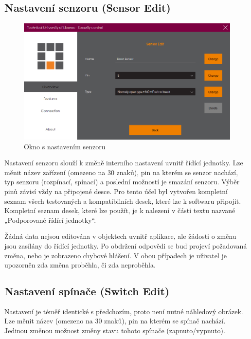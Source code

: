 \documentclass[FM,DP]{tulthesis}  %
\begin{document}
\subsection{Nastavení senzoru (Sensor Edit)}

\begin{figure}[H]
\begin{center}
\includegraphics[width=\textwidth]{images/settings.png}
\caption{Okno s nastavením senzoru}
\label{image}
\end{center}
\end{figure}

Nastavení senzoru slouží k změně interního nastavení uvnitř řídící jednotky. Lze měnit název zařízení (omezeno na 30 znaků), pin na kterém se senzor nachází, typ senzoru (rozpínací, spínací) a poslední možností je smazání senzoru. Výběr pinů závisí vždy na připojené desce. Pro tento účel byl vytvořen kompletní seznam všech testovaných a kompatibilních desek, které lze k softwaru připojit. Kompletní seznam desek, které lze použít, je k nalezení v části textu nazvané „Podporované řídící jednotky“. 

Žádná data nejsou editována v objektech uvnitř aplikace, ale žádosti o změnu jsou zasílány do řídící jednotky. Po obdržení odpovědi se buď projeví požadovaná změna, nebo je zobrazeno chybové hlášení. V obou případech je uživatel je upozorněn zda změna proběhla, či zda neproběhla.

\subsection{Nastavení spínače (Switch Edit)}
Nastavení je téměř identické s předchozím, proto není nutné náhledový obrázek. Lze měnit název (omezeno na 30 znaků), pin na kterém se spínač nachází. Jedinou změnou možnost změny stavu tohoto spínače (zapnuto/vypnuto).
\end{document}
